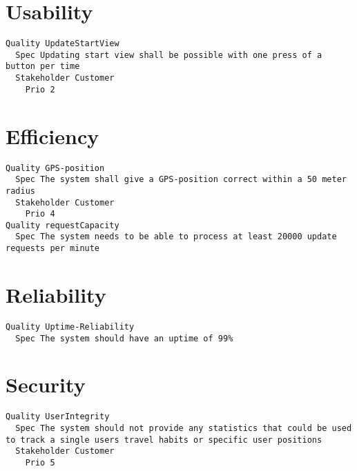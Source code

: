 \begin{lstlisting}

\end{lstlisting}


       \section{Usability}


\begin{lstlisting}
Quality UpdateStartView
  Spec Updating start view shall be possible with one press of a button per time
  Stakeholder Customer
    Prio 2

\end{lstlisting}
    
        
       \section{Efficiency}


\begin{lstlisting}
Quality GPS-position
  Spec The system shall give a GPS-position correct within a 50 meter radius
  Stakeholder Customer
    Prio 4
Quality requestCapacity
  Spec The system needs to be able to process at least 20000 update requests per minute

\end{lstlisting}
    
        
       \section{Reliability}


\begin{lstlisting}
Quality Uptime-Reliability
  Spec The system should have an uptime of 99%

\end{lstlisting}
    
        
       \section{Security}


\begin{lstlisting}
Quality UserIntegrity
  Spec The system should not provide any statistics that could be used to track a single users travel habits or specific user positions
  Stakeholder Customer
    Prio 5

\end{lstlisting}